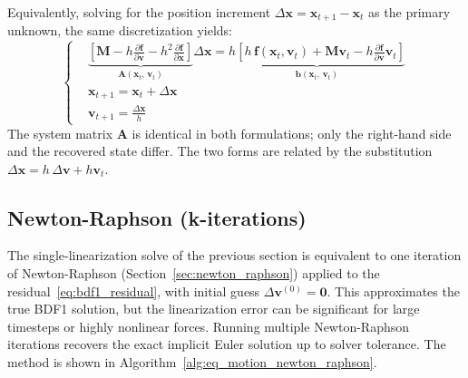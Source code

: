 \documentclass{article}
\begin{document}
Equivalently, solving for the position increment $\Delta\mathbf{x} = \mathbf{x}_{t+1} - \mathbf{x}_t$ as the primary unknown, the same discretization yields:
\begin{equation}
\label{eq:implicit_sim_position_based}
    \left\{
    \begin{aligned}
        &\underbrace{\left[
            \mathbf{M} - h\frac{\partial \mathbf{f}}{\partial \mathbf{v}}
            - h^2 \frac{\partial \mathbf{f}}{\partial \mathbf{x}}
        \right]}_{\mathbf{A}(\mathbf{x}_t,\, \mathbf{v}_t)}
        \Delta\mathbf{x} = 
        \underbrace{h\left[ h\,\mathbf{f}(\mathbf{x}_t, \mathbf{v}_t)
        + \mathbf{M}\mathbf{v}_t
        - h\frac{\partial \mathbf{f}}{\partial \mathbf{v}}\mathbf{v}_t\right]}_{\mathbf{b}(\mathbf{x}_t,\, \mathbf{v}_t)} \\[1ex]
        & \mathbf{x}_{t+1} = \mathbf{x}_t + \Delta\mathbf{x} \\
        & \mathbf{v}_{t+1} = \tfrac{\Delta\mathbf{x}}{h}
    \end{aligned}
    \right.
\end{equation}
The system matrix $\mathbf{A}$ is identical in both formulations; only the right-hand side and the recovered state differ. The two forms are related by the substitution $\Delta\mathbf{x} = h\,\Delta\mathbf{v} + h\mathbf{v}_t$.

\subsection{Newton-Raphson (k-iterations)}

The single-linearization solve of the previous section is equivalent to one iteration of Newton-Raphson (Section~\ref{sec:newton_raphson}) applied to the residual~\eqref{eq:bdf1_residual}, with initial guess $\Delta\mathbf{v}^{(0)} = \mathbf{0}$. This approximates the true BDF1 solution, but the linearization error can be significant for large timesteps or highly nonlinear forces. Running multiple Newton-Raphson iterations recovers the exact implicit Euler solution up to solver tolerance. The method is shown in Algorithm~\ref{alg:eq_motion_newton_raphson}.
\end{document}
